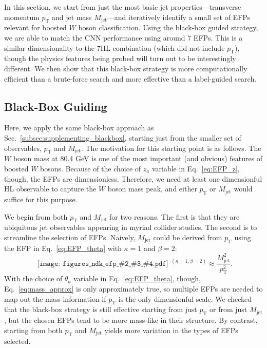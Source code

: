 \documentclass[aps,prd,twocolumn,superscriptaddress,preprintnumbers,nofootinbib,longbibliography,floatfix]{revtex4-1}
\newcommand{\Sec}[1]{Sec.~\ref{#1}}
\newcommand{\Eq}[1]{Eq.~\eqref{#1}}
\newcommand{\ndk}[4]{
	\begin{gathered}\texttt{[image: figures\_ndk\_efp\_\#2\_\#3\_\#4.pdf]}\end{gathered}
}
\begin{document}
In this section, we start from just the most basic jet properties---transverse momentum $p_{\textrm{T}}$ and jet mass $M_\textrm{jet}$---and iteratively identify a small set of EFPs relevant for boosted $W$ boson classification. Using the black-box guided strategy, we are able to match the CNN performance using around 7 EFPs. This is a similar dimensionality to the 7HL combination (which did not include $p_{\textrm{T}}$), though the physics features being probed will turn out to be interestingly different. We then show that this black-box strategy is more computationally efficient than a brute-force search and more effective than a label-guided search.

\subsection{Black-Box Guiding}
\label{subsec:iteratively_blackbox}
Here, we apply the same black-box approach as \Sec{subsec:supplementing_blackbox},  starting just from the smaller set of observables, $p_{\textrm{T}}$ and $M_{\textrm{jet}}$. The motivation for this starting point is as follows. The $W$ boson mass at 80.4 GeV is one of the most important (and obvious) features of boosted $W$ bosons. Because of the choice of $z_a$ variable in \Eq{eq:EFP_z}, though, the EFPs are dimensionless. Therefore, we need at least one dimensionful HL observable to capture the $W$ boson mass peak, and either $p_{\textrm{T}}$ or $M_{\textrm{jet}}$ would suffice for this purpose.

We begin from both $p_{\textrm{T}}$ and $M_{\textrm{jet}}$ for two reasons. The first is that they are ubiquitous jet observables appearing in myriad collider studies. The second is to streamline the selection of EFPs. Naively, $M_{\textrm{jet}}$ could be derived from $p_{\textrm{T}}$ using the EFP in \Eq{eq:EFP_theta} with $\kappa =1$ and $\beta = 2$:
\begin{equation}
\label{eq:mass_approx}
\ndk{0.045}{2}{1}{0} {}^{(\kappa = 1, \beta = 2)} \approx \frac{M^2_{\textrm{jet}}}{{p^2_{\textrm{T}}}}.
\end{equation}
With the choice of $\theta_a$ variable in \Eq{eq:EFP_theta}, though, \Eq{eq:mass_approx} is only approximately true, so multiple EFPs are needed to map out the mass information if $p_{\textrm{T}}$ is the only dimensionful scale. We checked that the black-box strategy is still effective starting from just $p_{\textrm{T}}$ or from just $M_{\textrm{jet}}$, but the chosen EFPs tend to be more mass-like in their structure. By contrast, starting from both $p_{\textrm{T}}$ and $M_{\textrm{jet}}$ yields more variation in the types of EFPs selected.
\end{document}
